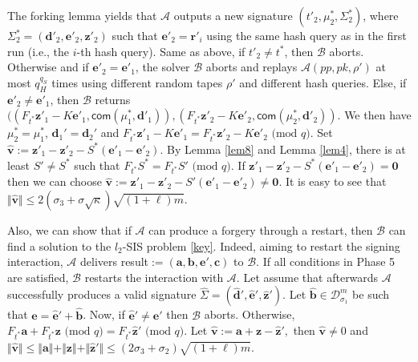 \documentclass[runningheads]{llncs}
\def\cal{\mathcal}
\def\bf{\mathbf}
\begin{document}
The forking lemma \cite[Lemma 4]{PS96} yields that $\mathcal{A}$ outputs a new signature $( t'_2, \mu^*_2, \Sigma_2^* )$, where $\Sigma_2^*=(\mathbf{d}'_2,\mathbf{e}'_2, \mathbf{z}'_2 )$ such that $\bf{e}'_2=\bf{r}'_i$ 
using the same hash query as in the first run (i.e., the $i$-th hash query). 
 Same as above, if $t'_2 \neq t^*$, then $\cal{B}$  aborts. Otherwise and if $\mathbf{e}'_2 = \mathbf{e}'_1$, the solver $\mathcal{B}$ aborts and replays $\mathcal{A}(pp, pk, \rho')$ at most $q_H^{q_S}$ times using different random tapes $\rho'$ and different hash queries. Else, if $\mathbf{e}'_2 \neq \mathbf{e}'_1$, then $\mathcal{B}$ returns $
 ((F_{t^*}\mathbf{z'}_1- K\mathbf{e}'_1 , \textsf{com}(\mu^*_1, \bf{d}'_1)), ( F_{t^*}\mathbf{z'}_2- K\mathbf{e}'_2 ,\textsf{com}(\mu^*_2, \bf{d}'_2)).
$	We then have $\mu^*_2=\mu^*_1$, $\bf{d}_1'=\bf{d}_2'$ and  $F_{t^*}\mathbf{z'}_1- K\mathbf{e}'_1 = F_{t^*}\mathbf{z'}_2- K\mathbf{e}'_2 \text{ (mod } q).$
Set $\widehat{\bf{v}}:=\mathbf{z'}_1-\mathbf{z'}_2- S^*(\mathbf{e}'_1-\mathbf{e}'_2 )$.  By Lemma \ref{lem8} and Lemma \ref{lem4}, there is at least $S'\neq S^*$ such that $F_{t^*}S^*=F_{t^*}S' \text{ (mod } q)$. If $\mathbf{z'}_1-\mathbf{z'}_2- S^*(\mathbf{e}'_1-\mathbf{e}'_2 )=\mathbf{0}$ then we can choose $\widehat{\textbf{v}}:=\mathbf{z'}_1-\mathbf{z'}_2- S'(\mathbf{e}'_1-\mathbf{e}'_2 ) \neq \mathbf{0}$. It is easy to see that $\Vert \widehat{\bf{v}}\Vert \leq 2(\sigma_3+\sigma\sqrt{\kappa})\sqrt{(1
	+\ell)m}$.
	
	Also, we can show that if $\mathcal{A}$ can produce a forgery through a restart, then $\mathcal{B}$ can find a solution to the $l_2$-\textsf{SIS} problem  \eqref{key}. Indeed, aiming to restart the signing interaction,  $\mathcal{A}$  delivers \textsf{result}$:=(\mathbf{a}, \mathbf{b}, \mathbf{e}', \mathbf{c})$ to $\mathcal{B}$. If all conditions in Phase 5 are satisfied, $\mathcal{B}$ restarts the interaction with $\mathcal{A}$. Let assume that afterwards $\mathcal{A}$ successfully produces a valid signature $ \widehat{\Sigma}=(\widehat{\mathbf{d}}', \widehat{\mathbf{e}}',\widehat{\mathbf{z}}')$. Let  $\widehat{\mathbf{b}} \in \mathcal{D}_{\sigma_1}^m$ be such that $\mathbf{e}=\widehat{\mathbf{e}}'+\widehat{\mathbf{b}}$. 
	Now, if $\widehat{\mathbf{e}}'\neq \mathbf{e}'$ then $\cal{B}$ aborts. Otherwise, 
	$F_{t^*}\mathbf{a}+F_{t^*}\mathbf{z} \text{ (mod } q)=F_{t^*}\widehat{\mathbf{z}}' \text{ (mod } q).$
	Let $\widehat{\bf{v}}:=\mathbf{a}+\mathbf{z} -\widehat{\mathbf{z}}',$ then $\widehat{\bf{v}} \neq 0$ and $\Vert\widehat{\bf{v}} \Vert \leq \Vert\mathbf{a} \Vert+\Vert\mathbf{z} \Vert+\Vert\widehat{\mathbf{z}}' \Vert \leq (2\sigma_3+\sigma_2)\sqrt{(1+\ell)m}$.  
	
\end{document}
